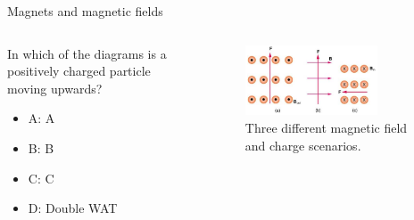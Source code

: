 \documentclass{beamer}
\begin{document}
\begin{frame}{Magnets and magnetic fields}
\begin{columns}[T]
\begin{column}{0.3\textwidth}
In which of the diagrams is a positively charged particle moving upwards?
\begin{itemize}
\item A: A
\item B: B
\item C: C
\item D: Double WAT
\end{itemize}
\end{column}
\begin{column}{0.7\textwidth}
\begin{figure}
\centering
\includegraphics[width=0.75\textwidth]{figures/lorentzProblem.png}
\caption{\label{fig:lorentzProblem3} Three different magnetic field and charge scenarios.}
\end{figure}
\end{column}
\end{columns}
\end{frame}
\end{document}
